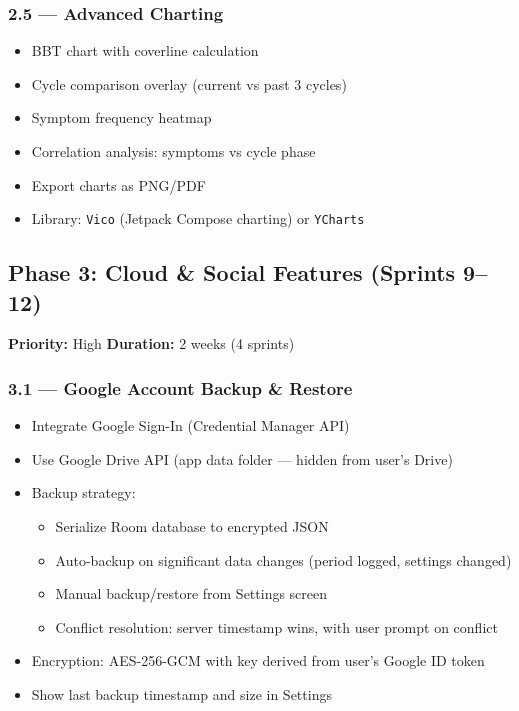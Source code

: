 \documentclass[12pt,a4paper]{article}
\begin{document}
\subsubsection{2.5 — Advanced Charting}
\begin{itemize}[leftmargin=1.5em]
  \item BBT chart with coverline calculation
  \item Cycle comparison overlay (current vs past 3 cycles)
  \item Symptom frequency heatmap
  \item Correlation analysis: symptoms vs cycle phase
  \item Export charts as PNG/PDF
  \item Library: \texttt{Vico} (Jetpack Compose charting) or \texttt{YCharts}
\end{itemize}

\subsection{\textcolor{phase3}{Phase 3: Cloud \& Social Features (Sprints 9--12)}}

\begin{tcolorbox}[colback=phase3!5, colframe=phase3, title=\textbf{Goal: Data persistence and sharing capabilities}]
\textbf{Priority:} High \hfill \textbf{Duration:} 2 weeks (4 sprints)
\end{tcolorbox}

\subsubsection{3.1 — Google Account Backup \& Restore}
\begin{itemize}[leftmargin=1.5em]
  \item Integrate Google Sign-In (Credential Manager API)
  \item Use Google Drive API (app data folder — hidden from user's Drive)
  \item Backup strategy:
  \begin{itemize}
    \item Serialize Room database to encrypted JSON
    \item Auto-backup on significant data changes (period logged, settings changed)
    \item Manual backup/restore from Settings screen
    \item Conflict resolution: server timestamp wins, with user prompt on conflict
  \end{itemize}
  \item Encryption: AES-256-GCM with key derived from user's Google ID token
  \item Show last backup timestamp and size in Settings
\end{itemize}
\end{document}
